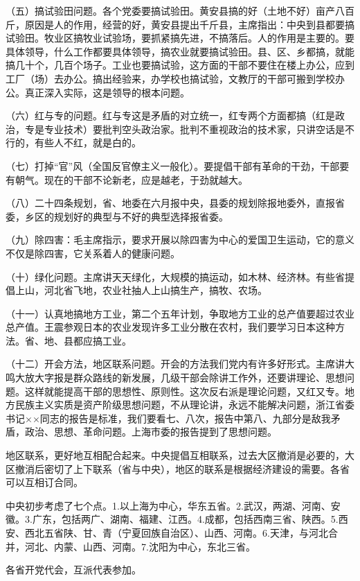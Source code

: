 （五）搞试验田问题。各个党委要搞试验田。黄安县搞的好（土地不好）亩产八百斤，原因是人的作用，经营的好，黄安县提出千斤县，主席指出：中央到县都要搞试验田。牧业区搞牧业试验场，要抓紧搞先进，不搞落后。人的作用是主要的。要具体领导，什么工作都要具体领导，搞农业就要搞试验田。县、区、乡都搞，就能搞几十个，几百个场子。工业也要搞试验，这方面的干部不要住在楼上办公，应到工厂（场）去办公。搞出经验来，办学校也搞试验，文教厅的干部可搬到学校办公。真正深入实际，这是领导的根本问题。

（六）红与专的问题。红与专这是矛盾的对立统一，红专两个方面都搞（红是政治，专是专业技术）要批判空头政治家。批判不重视政治的技术家，只讲空话是不行的，有些人不红，就是白的。

（七）打掉“官”风（全国反官僚主义一般化）。要提倡干部有革命的干劲，干部要有朝气。现在的干部不论新老，应是越老，于劲就越大。

（八）二十四条规划，省、地委在六月报中央，县委的规划除报地委外，直报省委，乡区的规划好的典型与不好的典型选择报省委。

（九）除四害：毛主席指示，要求开展以除四害为中心的爱国卫生运动，它的意义不仅是除四害，它关系着人的健康问题。

（十）绿化问题。主席讲天天绿化，大规模的搞运动，如木林、经济林。有些省提倡上山，河北省飞地，农业社抽人上山搞生产，搞牧、农场。

（十一）认真地搞地方工业，第二个五年计划，争取地方工业的总产值要超过农业总产值。王震参观日本的农业发现许多工业分散在农村，我们要学习日本这种方法。省、地、县都应搞工业。

（十二）开会方法，地区联系问题。开会的方法我们党内有许多好形式。主席讲大鸣大放大字报是群众路线的新发展，几级干部会除讲工作外，还要讲理论、思想问题。这样就能提高干部的思想性、原则性。这次反右派是理论问题，又红又专。地方民族主义实质是资产阶级思想问题，不从理论讲，永远不能解决问题，浙江省委书记××同志的报告是标准，我们要看七、八次，报告中第八、九部分是敌我矛盾，政治、思想、革命问题。上海市委的报告提到了思想问题。

地区联系，更好地互相配合起来。中央提倡互相联系，过去大区撤消是必要的，大区撤消后密切了上下联系（省与中央），地区的联系是根据经济建设的需要。各省可以互相订合同。

中央初步考虑了七个点。1.以上海为中心，华东五省。2.武汉，两湖、河南、安徽。3.广东，包括两广、湖南、福建、江西。4.成都，包括西南三省、陕西。5.西安、西北五省陕、甘、青（宁夏回族自治区）、山西、河南。6.天津，与河北合并，河北、内蒙、山西、河南。7.沈阳为中心，东北三省。

各省开党代会，互派代表参加。

